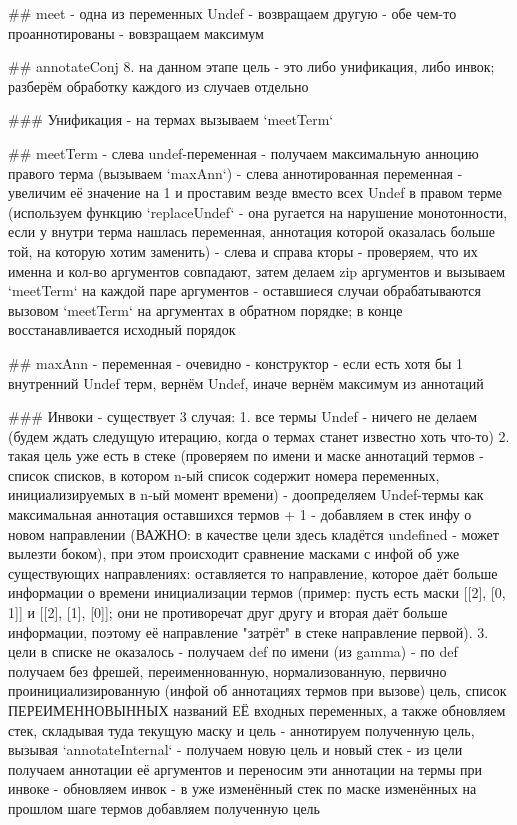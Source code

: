 \documentclass[conference]{IEEEtran}
\begin{document}
\#\# meet
- одна из переменных Undef - возвращаем другую
- обе чем-то проаннотированы - вовзращаем максимум

\#\# annotateConj
8. на данном этапе цель - это либо унификация, либо инвок; разберём обработку каждого из случаев отдельно

\#\#\# Унификация
- на термах вызываем `meetTerm`

\#\# meetTerm
- слева undef-переменная - получаем максимальную анноцию правого терма (вызываем `maxAnn`)
- слева аннотированная переменная - увеличим её значение на 1 и проставим везде вместо всех Undef в правом терме (используем функцию `replaceUndef` - она ругается на нарушение монотонности, если у внутри терма нашлась переменная, аннотация которой оказалась больше той, на которую хотим заменить)
- слева и справа кторы - проверяем, что их именна и кол-во аргументов совпадают, затем делаем zip аргументов и вызываем `meetTerm` на каждой паре аргументов
- оставшиеся случаи обрабатываются вызовом `meetTerm` на аргументах в обратном порядке; в конце восстанавливается исходный порядок

\#\# maxAnn
- переменная - очевидно
- конструктор - если есть хотя бы 1 внутренний Undef терм, вернём Undef, иначе вернём максимум из аннотаций

\#\#\# Инвоки
- существует 3 случая:
1. все термы Undef
  - ничего не делаем (будем ждать следущую итерацию, когда о термах станет известно хоть что-то)
2. такая цель уже есть в стеке (проверяем по имени и маске аннотаций термов - список списков, в котором n-ый список содержит номера переменных, инициализируемых в n-ый момент времени)
  - доопределяем Undef-термы как максимальная аннотация оставшихся термов + 1
  - добавляем в стек инфу о новом направлении (ВАЖНО: в качестве цели здесь кладётся undefined - может вылезти боком), при этом происходит сравнение масками с инфой об уже существующих направлениях: оставляется то направление, которое даёт больше информации о времени инициализации термов (пример: пусть есть маски [[2], [0, 1]] и [[2], [1], [0]]; они не противоречат друг другу и вторая даёт больше информации, поэтому её направление "затрёт" в стеке направление первой).
3. цели в списке не оказалось
  - получаем def по имени (из gamma)
  - по def получаем без фрешей, переименнованную, нормализованную, первично проинициализированную (инфой об аннотациях термов при вызове) цель, список ПЕРЕИМЕННОВЫННЫХ названий ЕЁ входных переменных, а также обновляем стек, складывая туда текущую маску и цель
  - аннотируем полученную цель, вызывая `annotateInternal` - получаем новую цель и новый стек
  - из цели получаем аннотации её аргументов и переносим эти аннотации на термы при инвоке - обновляем инвок
  - в уже изменённый стек по маске изменённых на прошлом шаге термов добавляем полученную цель
\end{document}
